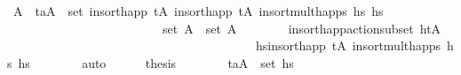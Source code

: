 \begin{isabellebody}
\ A{\isacharprime}{\kern0pt}{\isacharprime}{\kern0pt}{\isacharprime}{\kern0pt}\ \ {\isachardoublequoteopen}{\isacharparenleft}{\kern0pt}t\isactrlsub a{\isacharcomma}{\kern0pt}A{\isacharprime}{\kern0pt}{\isacharprime}{\kern0pt}{\isacharprime}{\kern0pt}{\isacharparenright}{\kern0pt}\ {\isasymin}\ set\ {\isacharparenleft}{\kern0pt}insort{\isacharunderscore}{\kern0pt}happ\ {\isacharparenleft}{\kern0pt}tA\ {\isacharparenleft}{\kern0pt}insort{\isacharunderscore}{\kern0pt}happ\ {\isacharparenleft}{\kern0pt}tA\ {\isacharparenleft}{\kern0pt}insort{\isacharunderscore}{\kern0pt}mult{\isacharunderscore}{\kern0pt}happs\ hs\ hs\ \isanewline
\ \ \ \ \ \ \ \ \ \ \ \ \ \ \ \ \ \ \ \ \ \ \ \ \ {\isachardoublequoteopen}set\ A{\isacharprime}{\kern0pt}{\isacharprime}{\kern0pt}\ {\isasymsubseteq}\ set\ A{\isacharprime}{\kern0pt}{\isacharprime}{\kern0pt}{\isacharprime}{\kern0pt}{\isachardoublequoteclose}\isanewline
\ \ \ \ \ \ \isamarkupfalse%
\ insort{\isacharunderscore}{\kern0pt}happ{\isacharunderscore}{\kern0pt}action{\isacharunderscore}{\kern0pt}subset{\isacharbrackleft}{\kern0pt}\ h{\isacharequal}{\kern0pt}{\isachardoublequoteopen}{\isacharparenleft}{\kern0pt}tA\ \isanewline
\ \ \ \ \ \ \ \ \ \ \ \ \ \ \ \ \ \ \ \ \ \ \ \ \ \ \ \ \ \ \ \ \ \ \ \ \ \ \ \ hs{\isacharequal}{\kern0pt}{\isachardoublequoteopen}insort{\isacharunderscore}{\kern0pt}happ\ {\isacharparenleft}{\kern0pt}tA\ {\isacharparenleft}{\kern0pt}insort{\isacharunderscore}{\kern0pt}mult{\isacharunderscore}{\kern0pt}happs\ hs\ hs\isanewline
\ \ \ \ \ \ \isamarkupfalse%
\ auto\isanewline
\ \ \ \ \isamarkupfalse%
\ {\isacharquery}{\kern0pt}thesis\isanewline
\ \ \ \ \ \ \isamarkupfalse%
\ {\isacartoucheopen}{\isacharparenleft}{\kern0pt}t\isactrlsub a{\isacharcomma}{\kern0pt}A{\isacharparenright}{\kern0pt}\ {\isasymin}\ set\ hs\ \isanewline

\end{isabellebody}
